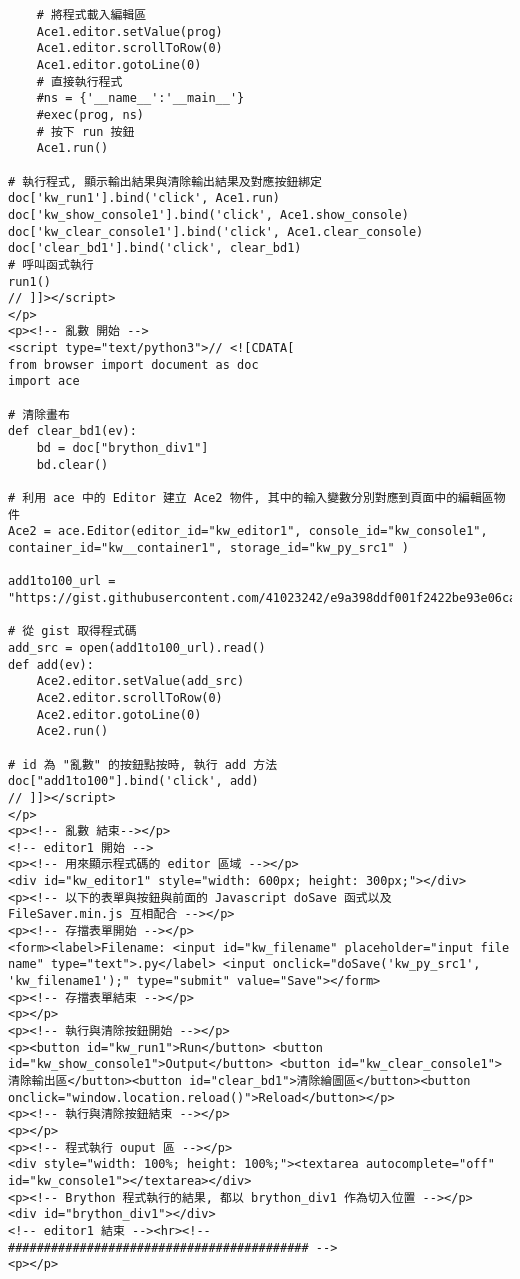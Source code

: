 \begin{lstlisting}
    # 將程式載入編輯區
    Ace1.editor.setValue(prog)
    Ace1.editor.scrollToRow(0)
    Ace1.editor.gotoLine(0)
    # 直接執行程式
    #ns = {'__name__':'__main__'}
    #exec(prog, ns)
    # 按下 run 按鈕
    Ace1.run()

# 執行程式, 顯示輸出結果與清除輸出結果及對應按鈕綁定
doc['kw_run1'].bind('click', Ace1.run)
doc['kw_show_console1'].bind('click', Ace1.show_console)
doc['kw_clear_console1'].bind('click', Ace1.clear_console)
doc['clear_bd1'].bind('click', clear_bd1)
# 呼叫函式執行
run1()
// ]]></script>
</p>
<p><!-- 亂數 開始 -->
<script type="text/python3">// <![CDATA[
from browser import document as doc
import ace

# 清除畫布
def clear_bd1(ev):
    bd = doc["brython_div1"]
    bd.clear()

# 利用 ace 中的 Editor 建立 Ace2 物件, 其中的輸入變數分別對應到頁面中的編輯區物件
Ace2 = ace.Editor(editor_id="kw_editor1", console_id="kw_console1", container_id="kw__container1", storage_id="kw_py_src1" )

add1to100_url = "https://gist.githubusercontent.com/41023242/e9a398ddf001f2422be93e06ca89638d/raw/6cfafceb8155ca8f8c1e87f568aa92e3d3bb1763/ggg"

# 從 gist 取得程式碼
add_src = open(add1to100_url).read()
def add(ev):
    Ace2.editor.setValue(add_src)
    Ace2.editor.scrollToRow(0)
    Ace2.editor.gotoLine(0)
    Ace2.run()

# id 為 "亂數" 的按鈕點按時, 執行 add 方法
doc["add1to100"].bind('click', add)
// ]]></script>
</p>
<p><!-- 亂數 結束--></p>
<!-- editor1 開始 -->
<p><!-- 用來顯示程式碼的 editor 區域 --></p>
<div id="kw_editor1" style="width: 600px; height: 300px;"></div>
<p><!-- 以下的表單與按鈕與前面的 Javascript doSave 函式以及 FileSaver.min.js 互相配合 --></p>
<p><!-- 存擋表單開始 --></p>
<form><label>Filename: <input id="kw_filename" placeholder="input file name" type="text">.py</label> <input onclick="doSave('kw_py_src1', 'kw_filename1');" type="submit" value="Save"></form>
<p><!-- 存擋表單結束 --></p>
<p></p>
<p><!-- 執行與清除按鈕開始 --></p>
<p><button id="kw_run1">Run</button> <button id="kw_show_console1">Output</button> <button id="kw_clear_console1">清除輸出區</button><button id="clear_bd1">清除繪圖區</button><button onclick="window.location.reload()">Reload</button></p>
<p><!-- 執行與清除按鈕結束 --></p>
<p></p>
<p><!-- 程式執行 ouput 區 --></p>
<div style="width: 100%; height: 100%;"><textarea autocomplete="off" id="kw_console1"></textarea></div>
<p><!-- Brython 程式執行的結果, 都以 brython_div1 作為切入位置 --></p>
<div id="brython_div1"></div>
<!-- editor1 結束 --><hr><!-- ########################################## -->
<p></p>
\end{lstlisting}
\newpage
